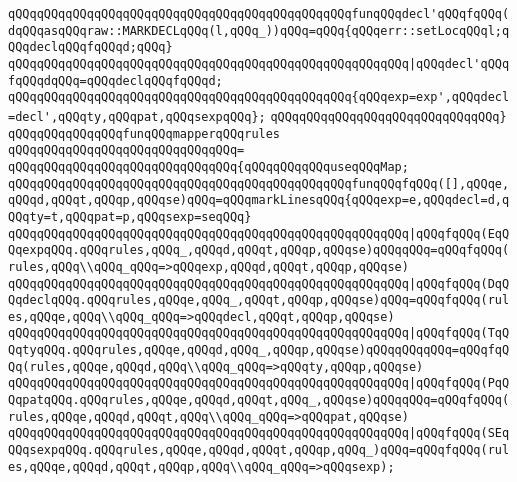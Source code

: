 \newline
\verb|qQQqqQQqqQQqqQQqqQQqqQQqqQQqqQQqqQQqqQQqqQQqqQQqfunqQQqdecl'qQQqfqQQq(dqQQqasqQQqraw::MARKDECLqQQq(l,qQQq_))qQQq=qQQq{qQQqerr::setLocqQQql;qQQqdeclqQQqfqQQqd;qQQq}|\newline
\verb|qQQqqQQqqQQqqQQqqQQqqQQqqQQqqQQqqQQqqQQqqQQqqQQqqQQqqQQq|\verb#|qQQqdecl'qQQqfqQQqdqQQq=qQQqdeclqQQqfqQQqd;#\newline
\newline
\verb|qQQqqQQqqQQqqQQqqQQqqQQqqQQqqQQqqQQqqQQqqQQqqQQq{qQQqexp=exp',qQQqdecl=decl',qQQqty,qQQqpat,qQQqsexpqQQq};|\newline
\verb|qQQqqQQqqQQqqQQqqQQqqQQqqQQqqQQq}|\newline
\newline
\verb|qQQqqQQqqQQqqQQqfunqQQqmapperqQQqrules|\newline
\verb|qQQqqQQqqQQqqQQqqQQqqQQqqQQqqQQq=|\newline
\verb|qQQqqQQqqQQqqQQqqQQqqQQqqQQqqQQq{qQQqqQQqqQQquseqQQqMap;|\newline
\newline
\verb|qQQqqQQqqQQqqQQqqQQqqQQqqQQqqQQqqQQqqQQqqQQqqQQqfunqQQqfqQQq([],qQQqe,qQQqd,qQQqt,qQQqp,qQQqse)qQQq=qQQqmarkLinesqQQq{qQQqexp=e,qQQqdecl=d,qQQqty=t,qQQqpat=p,qQQqsexp=seqQQq}|\newline
\verb|qQQqqQQqqQQqqQQqqQQqqQQqqQQqqQQqqQQqqQQqqQQqqQQqqQQqqQQq|\verb#|qQQqfqQQq(EqQQqexpqQQq.qQQqrules,qQQq_,qQQqd,qQQqt,qQQqp,qQQqse)qQQqqQQq=qQQqfqQQq(rules,qQQq\\qQQq_qQQq=>qQQqexp,qQQqd,qQQqt,qQQqp,qQQqse)#\newline
\verb|qQQqqQQqqQQqqQQqqQQqqQQqqQQqqQQqqQQqqQQqqQQqqQQqqQQqqQQq|\verb#|qQQqfqQQq(DqQQqdeclqQQq.qQQqrules,qQQqe,qQQq_,qQQqt,qQQqp,qQQqse)qQQq=qQQqfqQQq(rules,qQQqe,qQQq\\qQQq_qQQq=>qQQqdecl,qQQqt,qQQqp,qQQqse)#\newline
\verb|qQQqqQQqqQQqqQQqqQQqqQQqqQQqqQQqqQQqqQQqqQQqqQQqqQQqqQQq|\verb#|qQQqfqQQq(TqQQqtyqQQq.qQQqrules,qQQqe,qQQqd,qQQq_,qQQqp,qQQqse)qQQqqQQqqQQq=qQQqfqQQq(rules,qQQqe,qQQqd,qQQq\\qQQq_qQQq=>qQQqty,qQQqp,qQQqse)#\newline
\verb|qQQqqQQqqQQqqQQqqQQqqQQqqQQqqQQqqQQqqQQqqQQqqQQqqQQqqQQq|\verb#|qQQqfqQQq(PqQQqpatqQQq.qQQqrules,qQQqe,qQQqd,qQQqt,qQQq_,qQQqse)qQQqqQQq=qQQqfqQQq(rules,qQQqe,qQQqd,qQQqt,qQQq\\qQQq_qQQq=>qQQqpat,qQQqse)#\newline
\verb|qQQqqQQqqQQqqQQqqQQqqQQqqQQqqQQqqQQqqQQqqQQqqQQqqQQqqQQq|\verb#|qQQqfqQQq(SEqQQqsexpqQQq.qQQqrules,qQQqe,qQQqd,qQQqt,qQQqp,qQQq_)qQQq=qQQqfqQQq(rules,qQQqe,qQQqd,qQQqt,qQQqp,qQQq\\qQQq_qQQq=>qQQqsexp);#\newline
